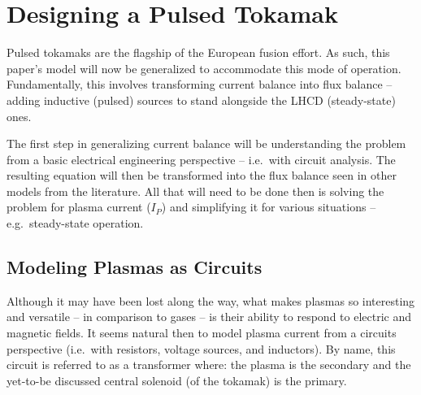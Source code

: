%
%
%
%
%
%
%
%

\chapter{Designing a Pulsed Tokamak}

\label{chapter:pulsed}

Pulsed tokamaks are the flagship of the European fusion  effort. As such, this paper's model will now be generalized to accommodate this mode of operation. Fundamentally, this involves transforming current balance into flux balance -- adding inductive (pulsed) sources to stand alongside the LHCD (steady-state) ones.

The first step in generalizing current balance will be understanding the problem from a basic electrical engineering perspective -- i.e.\ with circuit analysis. The resulting equation will then be transformed into the flux balance seen in other models from the literature. All that will need to be done then is solving the problem for plasma current ($I_P$) and simplifying it for various situations -- e.g.\ steady-state operation.


\section{Modeling Plasmas as Circuits}

Although it may have been lost along the way, what makes plasmas so interesting and versatile -- in comparison to gases -- is their ability to respond to electric and magnetic fields. It seems natural then to model plasma current from a circuits perspective (i.e.\ with resistors, voltage sources, and inductors). By name, this circuit is referred to as a transformer where: the plasma is the secondary and the yet-to-be discussed central solenoid (of the tokamak) is the primary.

